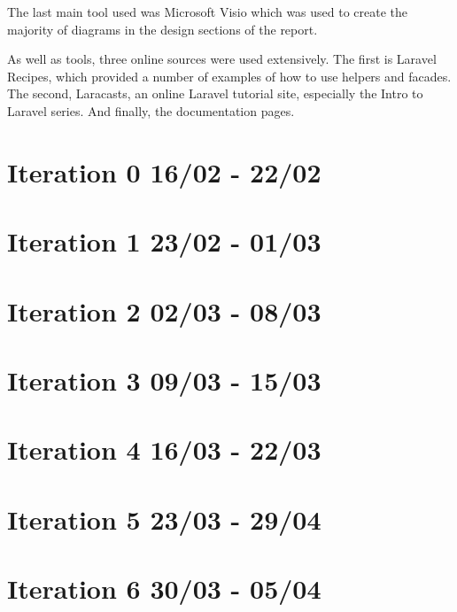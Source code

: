 The last main tool used was Microsoft Visio\cite{visio} which was used to create the majority of diagrams in the design sections of the report.

As well as tools, three online sources were used extensively. The first is Laravel Recipes, which provided a number of examples of how to use helpers and facades\cite{laravel-recipes}. The second, Laracasts, an online Laravel tutorial site, especially the Intro to Laravel series\cite{laracasts}. And finally, the documentation pages\cite{laravel-docs}.
\newpage

\section{Iteration 0 16/02 - 22/02}


\section{Iteration 1 23/02 - 01/03}



\section{Iteration 2 02/03 - 08/03}



\section{Iteration 3 09/03 - 15/03}



\section{Iteration 4 16/03 - 22/03}



\section{Iteration 5 23/03 - 29/04}



\section{Iteration 6 30/03 - 05/04}




